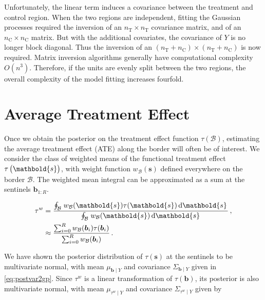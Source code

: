 \documentclass[letter]{article}
\newcommand{\treat}{\mathrm{T}}
\newcommand{\ctrol}{\mathrm{C}}
\newcommand{\svec}{\mathbold{s}}
\newcommand{\boundary}{\mathcal{B}}
\newcommand{\sentinels}{\bm{b}}
\newcommand{\tauw}{\tau^{w}}
\newcommand{\eqlabel}[1]{\label{#1}}
\newcommand{\numsent}{R}
\newcommand{\weightb}{w_{\boundary}}
\begin{document}
Unfortunately, the linear term induces a covariance between the treatment and control region.
When the two regions are independent, fitting the Gaussian processes required the inversion of an \(n_\treat{} \times n_\treat{}\) covariance matrix, and of an \(n_\ctrol{} \times n_\ctrol{}\) matrix.
But with the additional covariates, the covariance of \(Y\) is no longer block diagonal.
Thus the inversion of an \((n_\treat{}+n_\ctrol{}) \times (n_\treat{}+n_\ctrol{})\) is now required.
Matrix inversion algorithms generally have computational complexity \(O(n^3)\).
Therefore, if the units are evenly split between the two regions,
the overall complexity of the model fitting increases fourfold.
    


    	\section{Average Treatment Effect}\label{average-treatment-effect}
    

\label{sec:ate}
    	Once we obtain the posterior on the treatment effect function \(\tau(\boundary)\), estimating the average treatment effect (ATE) along the border will often be of interest.
We consider the class of weighted means of the functional treatment effect \(\tau\del{\svec}\),
with weight function \(\weightb(\svec)\) defined everywhere on the border \(\boundary\).
The weighted mean integral can be approximated as a sum at the sentinels \(\sentinels_{1:\numsent}\).

\begin{equation}\begin{split}
    \tauw &= \frac{\oint_\boundary \left. \weightb(\svec) \tau(\svec) \dif \svec \right.}
                  {\oint_\boundary \left. \weightb(\svec) \dif \svec \right.}\,,\\
          &\approx \frac{\sum_{i=0}^\numsent \weightb(\sentinels_i) \tau(\sentinels_i)}
                       {\sum_{i=0}^\numsent \weightb(\sentinels_i) } \,.
\end{split}
\eqlabel{eq:weighted_estimand}
\end{equation}

We have shown the posterior distribution of \(\tau(\svec)\) at the sentinels to be multivariate normal, with mean \(\mu_{\sentinels \mid Y}\) and covariance \(\Sigma_{\sentinels \mid Y}\) given in \eqref{eq:postvar2gp}.
Since \(\tauw\) is a linear transformation of \(\tau(\sentinels)\), its posterior is also multivariate normal, with mean \(\mu_{\tauw \mid Y}\) and covariance \(\Sigma_{\tauw \mid Y}\) given by
\end{document}
